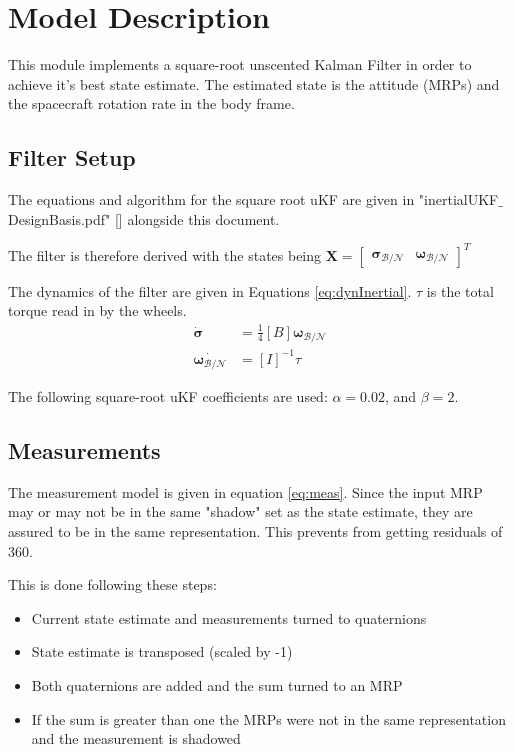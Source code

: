 
\section{Model Description}

This module implements a square-root unscented Kalman Filter in order to achieve it's best state estimate. The estimated state is the attitude (MRPs) and the spacecraft rotation rate in the body frame. 

\subsection{Filter Setup} %

The equations and algorithm for the square root uKF are given in "inertialUKF$\_$DesignBasis.pdf" [] alongside this document.

The filter is therefore derived with the states being $\bm X =\begin{bmatrix} \bm \sigma_{\mathcal{B}/\mathcal{N}}& \bm \omega_{\mathcal{B}/\mathcal{N}} \end{bmatrix}^{T}$

The dynamics of the filter are given in Equations \eqref{eq:dynInertial}. $\tau$ is the total torque read in by the wheels. 
\begin{align}
\label{eq:dynInertial}
\dot{\bm \sigma} &= \frac{1}{4} [B] \bm \omega_{\mathcal{B}/\mathcal{N}} \\
\dot{\bm \omega_{\mathcal{B}/\mathcal{N}}} & = [I]^{-1} \tau
\end{align}

The following square-root uKF coefficients are used: $\alpha = 0.02$, and $\beta = 2$. 


\subsection{Measurements}

The measurement model is given in equation \ref{eq:meas}. Since the input MRP may or may not be in the same "shadow" set as the state estimate, they are assured to be in the same representation. This prevents from getting residuals of 360\dg. 

This is done following these steps:

\begin{itemize}
\item Current state estimate and measurements turned to quaternions
\item State estimate is transposed (scaled by -1)
\item Both quaternions are added and the sum turned to an MRP
\item If the sum is greater than one the MRPs were not in the same representation and the measurement is shadowed
\end{itemize}

